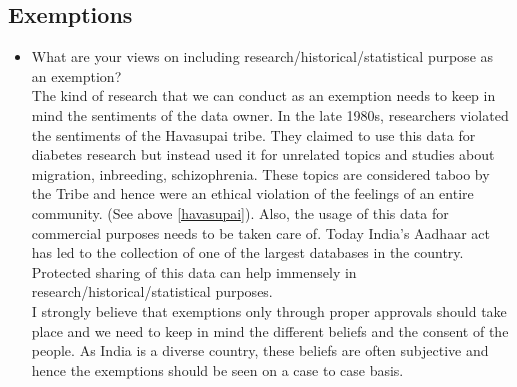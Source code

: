 \subsection{Exemptions}
\begin{itemize}
	\item What are your views on including research/historical/statistical purpose as an exemption?
	\\
	The kind of research that we can conduct as an exemption needs to keep in mind the sentiments of the data owner. In the late 1980s, researchers violated the sentiments of the Havasupai tribe. They claimed to use this data for diabetes research but instead used it for unrelated topics and studies about migration, inbreeding, schizophrenia. These topics are considered taboo by the Tribe and hence were an ethical violation of the feelings of an entire community. (See above \ref{havasupai}). Also, the usage of this data for commercial purposes needs to be taken care of. Today India's Aadhaar act has led to the collection of one of the largest databases in the country. Protected sharing of this data can help immensely in research/historical/statistical purposes.
	\\
	I strongly believe that exemptions only through proper approvals should take place and we need to keep in mind the different beliefs and the consent of the people. As India is a diverse country, these beliefs are often subjective and hence the exemptions should be seen on a case to case basis.
\end{itemize}
